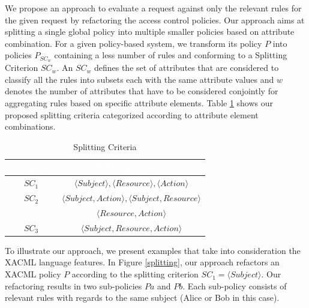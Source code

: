 We propose an approach to evaluate a request against only the relevant rules for the given request by refactoring the access control policies. Our approach aims at splitting a single global policy into 
multiple smaller policies based on attribute combination. For a given policy-based system, we transform its policy \normalsize $P$ into 
policies \normalsize $P_{SC_{w}}$ containing a less number of rules and conforming to a Splitting Criterion $SC_{w}$. 
An $SC_{w}$ defines the set of attributes that are considered to classify all the rules into subsets each with the same attribute values and $w$ denotes 
the number of attributes that have to be considered conjointly for aggregating rules based on specific attribute elements. Table \ref{table1} shows our proposed splitting criteria categorized according to attribute element combinations.
\begin{table}[h!]
\centering
\setlength{\extrarowheight}{6 pt}
\begin{tabular}{|>{\small}c|>{\small}c|}
\hline \rowcolor{black}
\bf
\textcolor{white}{Categories}& \bf \textcolor{white}{Splitting Criteria}\\ \hline
$SC_{1}$& {$\langle Subject \rangle, \langle Resource\rangle, \langle Action\rangle$}\\ \hline
$SC_{2}$& {$\langle Subject,Action \rangle, \langle Subject,Resource\rangle$}\\&{$\langle Resource,Action\rangle$}\\ \hline
$SC_{3}$& {$\langle Subject,Resource,Action\rangle$}\\ \hline
\end{tabular}
\caption{Splitting Criteria}
\label{table1}\end{table}

To illustrate our approach, we present examples that take into consideration the XACML language features. In Figure \ref{splitting}, our approach refactors an XACML policy $P$  according to the splitting criterion $SC_{1}=\langle Subject\rangle$. Our 
refactoring results in two sub-policies $Pa$ and $Pb$. Each sub-policy consists of relevant rules with regards to the same subject (Alice or Bob in this case). 

